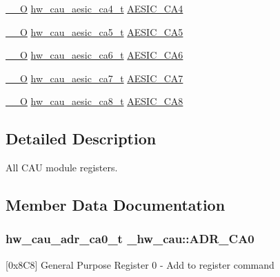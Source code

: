 \begin{DoxyCompactItemize}
\hyperlink{core__sc300_8h_a7e25d9380f9ef903923964322e71f2f6}{\+\_\+\+\_\+O} \hyperlink{union__hw__cau__aesic__ca4}{hw\+\_\+cau\+\_\+aesic\+\_\+ca4\+\_\+t} \hyperlink{struct__hw__cau_a5083ef6637fdba2104634764cdf478e7}{A\+E\+S\+I\+C\+\_\+\+C\+A4}
\item 
\hyperlink{core__sc300_8h_a7e25d9380f9ef903923964322e71f2f6}{\+\_\+\+\_\+O} \hyperlink{union__hw__cau__aesic__ca5}{hw\+\_\+cau\+\_\+aesic\+\_\+ca5\+\_\+t} \hyperlink{struct__hw__cau_a0f9123ca23f11a84db1ee402c8211270}{A\+E\+S\+I\+C\+\_\+\+C\+A5}
\item 
\hyperlink{core__sc300_8h_a7e25d9380f9ef903923964322e71f2f6}{\+\_\+\+\_\+O} \hyperlink{union__hw__cau__aesic__ca6}{hw\+\_\+cau\+\_\+aesic\+\_\+ca6\+\_\+t} \hyperlink{struct__hw__cau_a6280ae12497a86678819b417bacf9790}{A\+E\+S\+I\+C\+\_\+\+C\+A6}
\item 
\hyperlink{core__sc300_8h_a7e25d9380f9ef903923964322e71f2f6}{\+\_\+\+\_\+O} \hyperlink{union__hw__cau__aesic__ca7}{hw\+\_\+cau\+\_\+aesic\+\_\+ca7\+\_\+t} \hyperlink{struct__hw__cau_aabaf8ec257003dfb01e8d6f7f4001ac4}{A\+E\+S\+I\+C\+\_\+\+C\+A7}
\item 
\hyperlink{core__sc300_8h_a7e25d9380f9ef903923964322e71f2f6}{\+\_\+\+\_\+O} \hyperlink{union__hw__cau__aesic__ca8}{hw\+\_\+cau\+\_\+aesic\+\_\+ca8\+\_\+t} \hyperlink{struct__hw__cau_ae4e6fb5a34b1ccd3b9c963697e7e9ccf}{A\+E\+S\+I\+C\+\_\+\+C\+A8}
\end{DoxyCompactItemize}


\subsection{Detailed Description}
All C\+AU module registers. 

\subsection{Member Data Documentation}
\subsubsection[{\texorpdfstring{A\+D\+R\+\_\+\+C\+A0}{ADR_CA0}}]{ {\bf hw\+\_\+cau\+\_\+adr\+\_\+ca0\+\_\+t} \+\_\+hw\+\_\+cau\+::\+A\+D\+R\+\_\+\+C\+A0}\hypertarget{struct__hw__cau_a9bff4848b9486437f34a8f263c7cba5b}{}\label{struct__hw__cau_a9bff4848b9486437f34a8f263c7cba5b}
\mbox{[}0x8\+C8\mbox{]} General Purpose Register 0 -\/ Add to register command 
